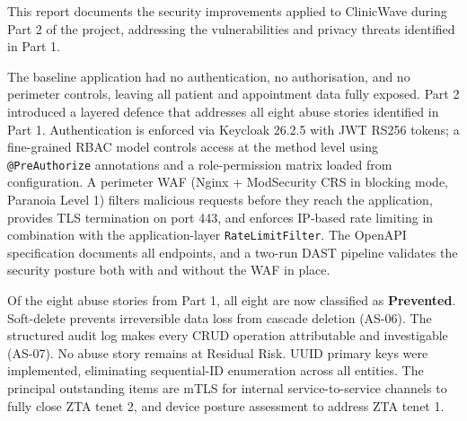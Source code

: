 \documentclass[12pt,a4paper]{report}
\begin{document}
This report documents the security improvements applied to ClinicWave during Part 2 of the
project, addressing the vulnerabilities and privacy threats identified in Part 1.

The baseline application had no authentication, no authorisation, and no perimeter controls,
leaving all patient and appointment data fully exposed. Part 2 introduced a layered defence
that addresses all eight abuse stories identified in Part 1. Authentication is
enforced via Keycloak 26.2.5 with JWT RS256 tokens; a fine-grained RBAC model controls access
at the method level using \texttt{@PreAuthorize} annotations and a role-permission matrix
loaded from configuration. A perimeter WAF (Nginx + ModSecurity CRS in blocking mode, Paranoia
Level 1) filters malicious requests before they reach the application, provides TLS termination
on port 443, and enforces IP-based rate limiting in combination with the application-layer
\texttt{RateLimitFilter}. The OpenAPI specification documents all endpoints, and a two-run DAST
pipeline validates the security posture both with and without the WAF in place.

Of the eight abuse stories from Part 1, all eight are now classified as \textbf{Prevented}.
Soft-delete prevents irreversible data loss from cascade deletion (AS-06). The structured audit
log makes every CRUD operation attributable and investigable (AS-07). No abuse story remains at
Residual Risk. UUID primary keys were implemented, eliminating
sequential-ID enumeration across all entities. The principal outstanding items are mTLS for
internal service-to-service channels to fully close ZTA tenet 2, and device posture assessment
to address ZTA tenet 1.
\end{document}
